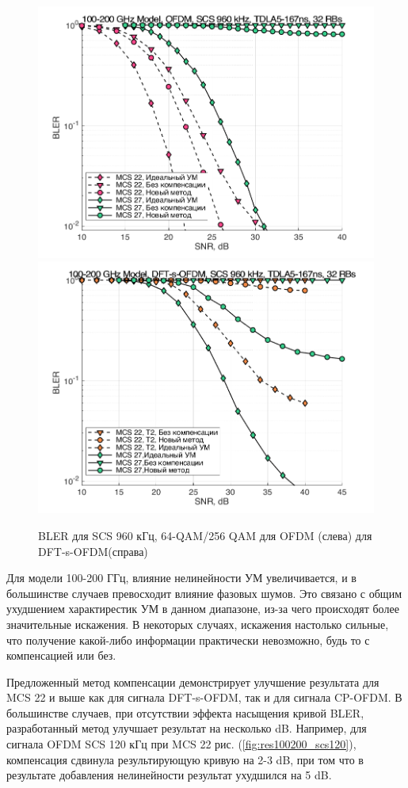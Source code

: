 \begin{figure}[h!]
    \centering
    \includegraphics[width=0.49\linewidth]{figs/res/ofdm/OFDM_SubTHz_SCS960_MCS22_27.png}
    \includegraphics[width=0.49\linewidth]{figs/res/dftsofdm/DFT-s-OFDM_SubTHz_SCS960_MCS22_27.png}
    \caption{BLER для SCS 960 кГц, 64-QAM/256 QAM для OFDM (слева) для DFT-s-OFDM(справа)}
    \label{fig:res100200_scs960}
\end{figure}

Для модели 100-200 ГГц, влияние нелинейности УМ увеличивается, и в
большинстве случаев превосходит влияние фазовых шумов. Это связано с общим
ухудшением характирестик УМ в данном диапазоне, из-за чего происходят более
значительные искажения. В некоторых случаях, искажения настолько сильные,
что получение какой-либо информации практически невозможно, будь то с
компенсацией или без.

Предложенный метод компенсации демонстрирует улучшение результата для MCS
22 и выше как для сигнала DFT-s-OFDM, так и для сигнала CP-OFDM. В
большинстве случаев, при отсутствии эффекта насыщения кривой BLER,
разработанный метод улучшает результат на несколько dB. Например, для
сигнала OFDM SCS 120 кГц при MCS 22 рис. (\ref{fig:res100200_scs120}),
компенсация сдвинула результирующую кривую на 2-3 dB, при том что в
результате добавления нелинейности результат ухудшился на 5 dB. 


